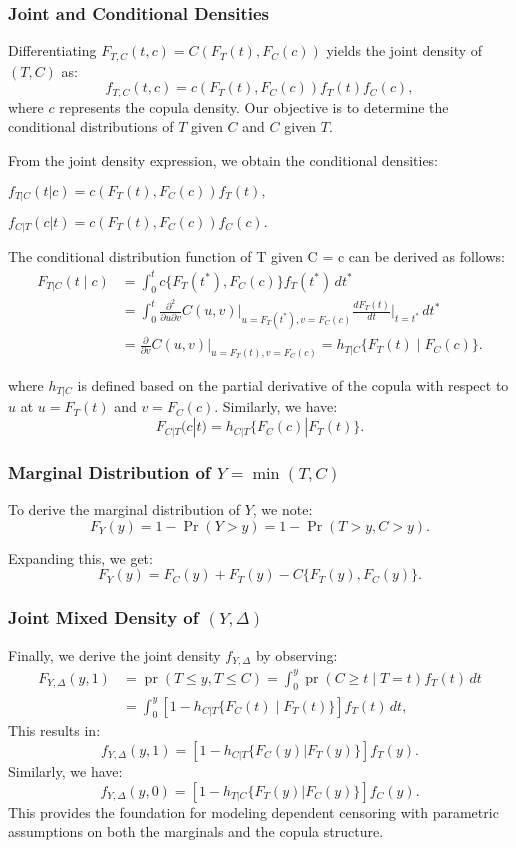 \subsubsection*{Joint and Conditional Densities}

Differentiating  $F_{T, C}(t, c) = C(F_T(t), F_C(c))$  yields the joint density of  $(T, C)$  as:
$$f_{T, C}(t, c) = c(F_T(t), F_C(c)) f_T(t) f_C(c),$$
where  $c$  represents the copula density. Our objective is to determine the conditional distributions of  $T$  given  $C$  and  $C$  given  $T$.

From the joint density expression, we obtain the conditional densities:

$f_{T | C}(t | c) = c(F_T(t), F_C(c)) f_T(t),$

$f_{C | T}(c | t) = c(F_T(t), F_C(c)) f_C(c).$


The conditional distribution function of  T  given  C = c  can be derived as follows:
\begin{align*}
F_{T|C}(t \mid c) &= \int_0^t c\{F_T(t^*), F_C(c)\} f_T(t^*) \, dt^* \\
&= \int_0^t \frac{\partial^2}{\partial u \partial v} C(u, v) \bigg|_{u = F_T(t^*), v = F_C(c)} \frac{d F_T(t)}{dt} \bigg|_{t = t^*} \, dt^* \\
&= \frac{\partial}{\partial v} C(u, v) \bigg|_{u = F_T(t), v = F_C(c)} = h_{T|C}\{F_T(t) \mid F_C(c)\}.
\end{align*}

where $h_{T|C}$ is defined based on the partial derivative of the copula with respect to  $u$  at  $u = F_T(t)$  and  $v = F_C(c)$. Similarly, we have:
$$F_{C|T}(c | t) = h_{C|T}\{F_C(c) | F_T(t)\}.$$


\subsubsection*{Marginal Distribution of  $Y = \min(T, C)$}

To derive the marginal distribution of  $Y$, we note:
$$F_Y(y) = 1 - \Pr(Y > y) = 1 - \Pr(T > y, C > y).$$

Expanding this, we get:
$$F_Y(y) = F_C(y) + F_T(y) - C\{F_T(y), F_C(y)\}.$$

\subsubsection*{Joint Mixed Density of  $(Y, \Delta)$}

Finally, we derive the joint density  $f_{Y, \Delta}$  by observing:
\begin{align*}
F_{Y, \Delta}(y, 1) &= \operatorname{pr}(T \leq y, T \leq C) = \int_0^y \operatorname{pr}(C \geq t \mid T = t) f_T(t) \, dt \\
&= \int_0^y \left[1 - h_{C|T}\{F_C(t) \mid F_T(t)\}\right] f_T(t) \, dt,
\end{align*}
This results in:
$$f_{Y, \Delta}(y, 1) = \left[1 - h_{C|T}\{F_C(y) | F_T(y)\}\right] f_T(y).$$
Similarly, we have:
$$f_{Y, \Delta}(y, 0) = \left[1 - h_{T|C}\{F_T(y) | F_C(y)\}\right] f_C(y).$$
This provides the foundation for modeling dependent censoring with parametric assumptions on both the marginals and the copula structure.
